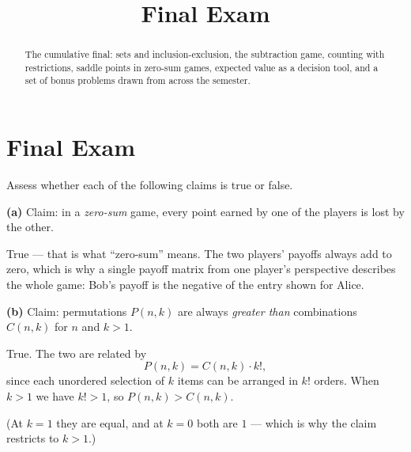 \documentclass[12pt]{ximera}
\title{Final Exam}
\begin{document}
\begin{abstract}
The cumulative final: sets and inclusion-exclusion, the subtraction game, counting
with restrictions, saddle points in zero-sum games, expected value as a decision
tool, and a set of bonus problems drawn from across the semester.
\end{abstract}
\maketitle

\section*{Final Exam}

\begin{problem}
Assess whether each of the following claims is true or false.

\begin{prompt}
\textbf{(a)} Claim: in a \emph{zero-sum} game, every point earned by one of the
players is lost by the other.

\begin{multipleChoice}
\end{multipleChoice}

\begin{feedback}
True --- that is what ``zero-sum'' means. The two players' payoffs always add to
zero, which is why a single payoff matrix from one player's perspective describes the
whole game: Bob's payoff is the negative of the entry shown for Alice.
\end{feedback}
\end{prompt}

\begin{prompt}
\textbf{(b)} Claim: permutations $P(n,k)$ are always \emph{greater than} combinations
$C(n,k)$ for $n$ and $k>1$.

\begin{multipleChoice}
\end{multipleChoice}

\begin{feedback}
True. The two are related by
\[ P(n,k) = C(n,k)\cdot k!, \]
since each unordered selection of $k$ items can be arranged in $k!$ orders. When
$k>1$ we have $k!>1$, so $P(n,k)>C(n,k)$.

(At $k=1$ they are equal, and at $k=0$ both are $1$ --- which is why the claim
restricts to $k>1$.)
\end{feedback}
\end{prompt}
\end{problem}
\end{document}
